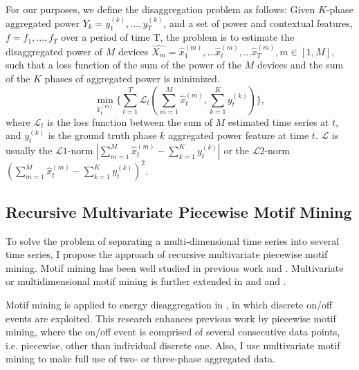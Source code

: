 For our purposes, we define the disaggregation problem as follows:
Given $K$-phase aggregated power 
$Y_k=y_1^{(k)}, ..., y_T^{(k)}$, and a set of
power %
and contextual features, $f=f_1, ..., f_T$ over a period of time T, 
the problem is to estimate the disaggregated power %
of $M$ devices 
$\hat{X_m }= \hat{x}_{1}^{(m)}, ...\hat{x}_{t}^{(m)}, ... \hat{x}_{T}^{(m)}, m\in[1, M]$, 
such that a loss function of the sum of the power %
of the $M$
devices and the sum of the $K$ phases of aggregated power %
is minimized. 
\begin{equation}
\label{eq_powerObj}
\min_{\hat{x}_{t}^{(m)}} \{ \sum_{t=1}^T \mathscr{L}_t(\sum_{m=1}^M \hat{x}_{t}^{(m)}, \sum_{k=1}^Ky_t^{(k)}) \},
\end{equation}
where $\mathscr{L}_t$ is the loss function between 
the sum of $M$ estimated time series at $t$, 
and $y_t^{(k)}$ is the ground truth phase $k$ aggregated power %
feature at time $t$. 
$\mathscr{L}$ is usually the $\mathscr{L}1$-norm $|\sum_{m=1}^M \hat{x}_{t}^{(m)} -\sum_{k=1}^K y_t^{(k)}|$
or the $\mathscr{L}2$-norm $(\sum_{m=1}^M \hat{x}_{t}^{(m)}-\sum_{k=1}^Ky_t^{(k)})^2$.

\subsection{Recursive Multivariate Piecewise Motif Mining}
To solve the problem of separating a multi-dimensional time series into several time series, 
I propose the approach of recursive multivariate piecewise motif mining. 
Motif mining has been well studied in previous work \cite{motif1} and \cite{motif2}. 
Multivariate or multidimensional motif mining is further extended in \cite{minnen2007improving} and \cite{tanaka2005discovery} and \cite{motifgoal}. 

Motif mining is applied to energy disaggregation in \cite{shao2013temporal}, 
in which discrete on/off events are exploited. 
This research enhances previous work by piecewise motif mining, 
where the on/off event is comprised of several consecutive data points, 
i.e. piecewise, other than individual discrete one.
Also, I use multivariate motif mining to make full use of two- or three-phase aggregated data. 

